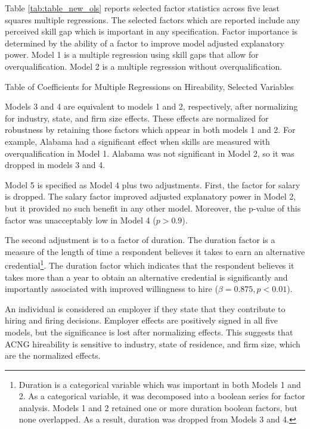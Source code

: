 \documentclass[review]{elsarticle}
\begin{document}
Table \ref{tab:table_new_ols} reports selected factor statistics across five least squares multiple regressions.
The selected factors which are reported include any perceived skill gap which is important in any specification.
Factor importance is determined by the ability of a factor to improve model adjusted explanatory power.
Model 1 is a multiple regression using skill gaps that allow for overqualification.
Model 2 is a multiple regression without overqualification.

\begin{table}
    \caption{Table of Coefficients for Multiple Regressions on Hireability, Selected Variables}
    \resizebox{\columnwidth}{!}{
        
    }
    \label{tab:table_new_ols}
\end{table}

Models 3 and 4 are equivalent to models 1 and 2, respectively, after normalizing for industry, state, and firm size effects.
These effects are normalized for robustness by retaining those factors which appear in both models 1 and 2.
For example, Alabama had a significant effect when skills are measured with overqualification in Model 1.
Alabama was not significant in Model 2, so it was dropped in models 3 and 4.

Model 5 is specified as Model 4 plus two adjustments.
First, the factor for salary is dropped.
The salary factor improved adjusted explanatory power in Model 2, but it provided no such benefit in any other model.
Moreover, the p-value of this factor was unacceptably low in Model 4 ($p > 0.9$).

The second adjustment is to a factor of duration.
The duration factor is a measure of the length of time a respondent believes it takes to earn an alternative credential\footnote{
    Duration is a categorical variable which was important in both Models 1 and 2.
    As a categorical variable, it was decomposed into a boolean series for factor analysis.
    Models 1 and 2 retained one or more duration boolean factors, but none overlapped.
    As a result, duration was dropped from Models 3 and 4.
}.
The duration factor which indicates that the respondent believes it takes more than a year to obtain an alternative credential
is significantly and importantly associated with improved willingness to hire ($\beta = 0.875, p < 0.01$).

An individual is considered an employer if they state that they contribute to hiring and firing decisions.
Employer effects are positively signed in all five models, but the significance is lost after normalizing effects.
This suggests that ACNG hireability is sensitive to industry, state of residence, and firm size, which are the normalized effects.
\end{document}
